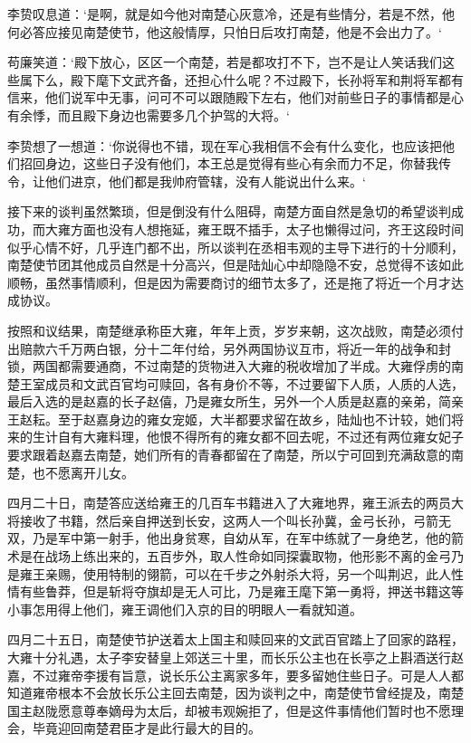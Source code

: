 李贽叹息道：‘是啊，就是如今他对南楚心灰意冷，还是有些情分，若是不然，他何必答应接见南楚使节，他这般情厚，只怕日后攻打南楚，他是不会出力了。‘

苟廉笑道：‘殿下放心，区区一个南楚，若是都攻打不下，岂不是让人笑话我们这些属下么，殿下麾下文武齐备，还担心什么呢？不过殿下，长孙将军和荆将军都有信来，他们说军中无事，问可不可以跟随殿下左右，他们对前些日子的事情都是心有余悸，而且殿下身边也需要多几个护驾的大将。‘

李贽想了一想道：‘你说得也不错，现在军心我相信不会有什么变化，也应该把他们招回身边，这些日子没有他们，本王总是觉得有些心有余而力不足，你替我传令，让他们进京，他们都是我帅府管辖，没有人能说出什么来。‘

接下来的谈判虽然繁琐，但是倒没有什么阻碍，南楚方面自然是急切的希望谈判成功，而大雍方面也没有人想拖延，雍王既不插手，太子也懒得过问，齐王这段时间似乎心情不好，几乎连门都不出，所以谈判在丞相韦观的主导下进行的十分顺利，南楚使节团其他成员自然是十分高兴，但是陆灿心中却隐隐不安，总觉得不该如此顺畅，虽然事情顺利，但是因为需要商讨的细节太多了，还是拖了将近一个月才达成协议。

按照和议结果，南楚继承称臣大雍，年年上贡，岁岁来朝，这次战败，南楚必须付出赔款六千万两白银，分十二年付给，另外两国协议互市，将近一年的战争和封锁，两国都需要通商，不过南楚的货物进入大雍的税收增加了半成。大雍俘虏的南楚王室成员和文武百官均可赎回，各有身价不等，不过要留下人质，人质的人选，最后入选的是赵嘉的长子赵僖，乃是雍女所生，另外一个人质是赵嘉的亲弟，简亲王赵耘。至于赵嘉身边的雍女宠姬，大半都要求留在故乡，陆灿也不计较，她们将来的生计自有大雍料理，他恨不得所有的雍女都不回去呢，不过还有两位雍女妃子要求跟着赵嘉去南楚，她们所有的青春都留在了南楚，所以宁可回到充满敌意的南楚，也不愿离开儿女。

四月二十日，南楚答应送给雍王的几百车书籍进入了大雍地界，雍王派去的两员大将接收了书籍，然后亲自押送到长安，这两人一个叫长孙冀，金弓长孙，弓箭无双，乃是军中第一射手，他出身贫寒，自幼从军，在军中练就了一身绝艺，他的箭术是在战场上练出来的，五百步外，取人性命如同探囊取物，他形影不离的金弓乃是雍王亲赐，使用特制的翎箭，可以在千步之外射杀大将，另一个叫荆迟，此人性情有些鲁莽，但是斩将夺旗却是无人可比，乃是雍王麾下第一勇将，押送书籍这等小事怎用得上他们，雍王调他们入京的目的明眼人一看就知道。

四月二十五日，南楚使节护送着太上国主和赎回来的文武百官踏上了回家的路程，大雍十分礼遇，太子李安替皇上郊送三十里，而长乐公主也在长亭之上斟酒送行赵嘉，不过雍帝李援有旨意，说长乐公主离家多年，要多留她住些日子。可是人人都知道雍帝根本不会放长乐公主回去南楚，因为谈判之中，南楚使节曾经提及，南楚国主赵陇愿意尊奉嫡母为太后，却被韦观婉拒了，但是这件事情他们暂时也不愿理会，毕竟迎回南楚君臣才是此行最大的目的。

